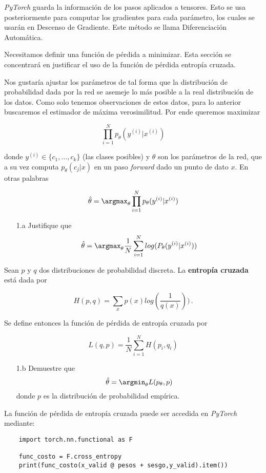 \textit{PyTorch} guarda la información de los pasos aplicados a tensores. Esto se usa posteriormente para computar los gradientes para cada parámetro, los cuales se usarán en Descenso de Gradiente. Este método se llama Diferenciación Automática.

\newp Necesitamos definir una función de pérdida a minimizar. Esta sección se concentrará en justificar el uso de la función de pérdida entropía cruzada.

\newp Nos gustaría ajustar los parámetros de tal forma que la distribución de probabilidad dada por la red se asemeje lo más posible a la real distribución de los datos. Como solo tenemos observaciones de estos datos, para lo anterior buscaremos el estimador de máxima verosimilitud. Por ende queremos maximizar

$$ \prod^N_{i=1}p_\theta(y^{(i)}|x^{(i)})$$

donde $y^{(i)}\in\{c_1,\dots,c_k\}$ (las clases posibles) y $\theta$ son los parámetros de la red, que a su vez computa $p_\theta(c_j|x)$ en un paso \textit{forward} dado un punto de dato $x$. En otras palabras

$$ \hat\theta = \argmax_\theta \prod^N_{i=1}p_\theta(y^{(i)}|x^{(i)}) $$

\begin{enumerate}
	\item[1.a] Justifique que
    $$ \hat\theta = \argmax_\theta \frac{1}{N} \sum^N_{i=1} log(P_\theta(y^{(i)}|x^{(i)})) $$
\end{enumerate}

Sean $p$ y $q$ dos distribuciones de probabilidad discreta. La \textbf{entropía cruzada} está dada por 

$$ H(p,q) = \sum_x p(x) log(\frac{1}{q(x)})) \,.$$

Se define entonces la función de pérdida de entropía cruzada por

$$ L(q,p) = \frac{1}{N}\sum^N_{i=1}H(p_i,q_i) $$

\begin{enumerate}
	\item[1.b] Demuestre que
    $$ \hat\theta = \argmin_\theta L(p_\theta,p)$$
    donde $p$ es la distribución de probabilidad empírica.
\end{enumerate}

La función de pérdida de entropía cruzada puede ser accedida en \textit{PyTorch} mediante:

\begin{verbatim}
    import torch.nn.functional as F

    func_costo = F.cross_entropy
    print(func_costo(x_valid @ pesos + sesgo,y_valid).item())
\end{verbatim}

